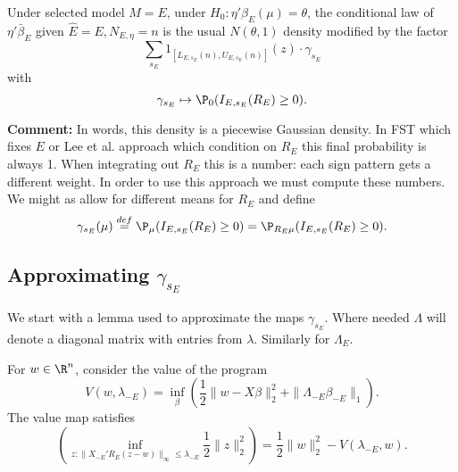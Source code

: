 \documentclass{article}
\newcommand{\OLS}{\bar{\beta}}
\begin{document}
        \begin{lemma}
          Under selected model $M=E$, under $H_0:\eta'\beta_E(\mu)=\theta$,
          the conditional law of $\eta'\OLS_E$
          given $\hat{E}=E, N_{E,\eta}=n$ is
          the usual $N(\theta, 1)$ density modified by the factor
          \begin{equation}
            \label{eq:union}
            \sum_{s_E}  1_{[L_{E,s_E}(n), U_{E,s_E}(n)]}(z) \cdot \gamma_{s_E}
            \end{equation}
          with
        $$
        \gamma_{s_E} \mapsto \P_0(I_{E,s_E}(R_E) \geq 0).
        $$
          \end{lemma}

        {\bf Comment:}
        In words, this density is a piecewise Gaussian density. In FST
        which fixes $E$ or Lee et al. approach which condition on $R_E$ this final
        probability is always 1. When integrating out $R_E$ this is a number:
        each sign pattern gets a different weight. In order to use this approach we must
        compute these numbers.
        We might as  allow for different means for $R_E$ and
        define
          \begin{equation}
            \label{eq:sign:prob}
            \gamma_{s_E}(\mu) \overset{def}{=} \P_{\mu}(I_{E,s_E}(R_E) \geq 0) = \P_{R_E\mu}(I_{E,s_E}(R_E) \geq 0).
          \end{equation}
        
          \subsection{Approximating $\gamma_{s_E}$}

          We start with a lemma used to approximate the maps $\gamma_{s_E}$. Where
          needed $\Lambda$ will denote a diagonal matrix with entries from $\lambda$. Similarly
          for $\Lambda_E$.
          
        \begin{lemma}
          For $w \in \R^n$, consider the value of the program
          \begin{equation}
            \label{eq:dual:value}
            V(w,\lambda_{-E}) = \inf_{\beta} \left(\frac{1}{2} \|w-X\beta\|^2_2 +  \|\Lambda_{-E}\beta_{-E}\|_1 \right).
          \end{equation}
          The value map satisfies
          \begin{equation}
            \label{eq:value:map}
\left(          \inf_{z:\|X_{-E}'R_E(z-w)\|_{\infty} \leq \lambda_{-E}} \frac{1}{2} \|z\|^2_2 \right) = \frac{1}{2} \|w\|^2_2 - V(\lambda_{-E}, w).
          \end{equation}

          \end{lemma}
\end{document}
